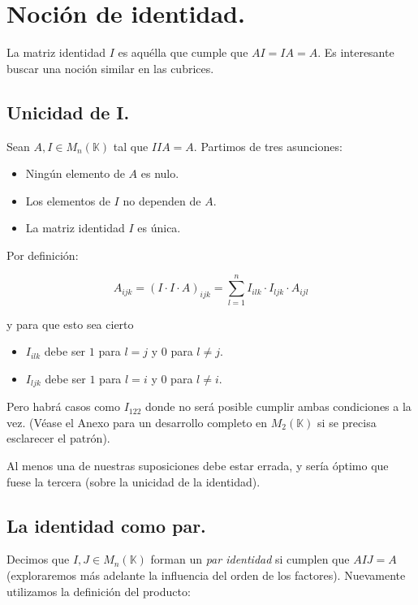 \section{Noción de identidad.}

La matriz identidad $I$ es aquélla que cumple que $AI = IA = A$. Es interesante buscar una noción similar en las cubrices.

\subsection{Unicidad de I.}

Sean $A, I \in M_{n} (\mathbb{K})$ tal que $IIA = A$. Partimos de tres asunciones:

\begin{itemize}
	\item Ningún elemento de $A$ es nulo.
	\item Los elementos de $I$ no dependen de $A$.
	\item La matriz identidad $I$ es única.
\end{itemize}

Por definición:

$$A_{ijk} = (I \cdot I \cdot A)_{ijk} = \sum\limits_{l=1}^{n} I_{ilk} \cdot I_{ljk} \cdot A_{ijl}$$

y para que esto sea cierto

\begin{itemize}
	\item $I_{ilk}$ debe ser $1$ para $l = j$ y $0$ para $l \neq j$. 
	\item $I_{ljk}$ debe ser $1$ para $l = i$ y $0$ para $l \neq i$.
\end{itemize}

Pero habrá casos como $I_{122}$ donde no será posible cumplir ambas condiciones a la vez. (Véase el Anexo para un desarrollo completo en $M_2 (\mathbb{K})$ si se precisa esclarecer el patrón).

Al menos una de nuestras suposiciones debe estar errada, y sería óptimo que fuese la tercera (sobre la unicidad de la identidad).

\newpage

\subsection{La identidad como par.}

Decimos que $I, J \in M_{n} (\mathbb{K})$ forman un \textit{par identidad} si cumplen que $AIJ = A$ (exploraremos más adelante la influencia del orden de los factores). Nuevamente utilizamos la definición del producto:

